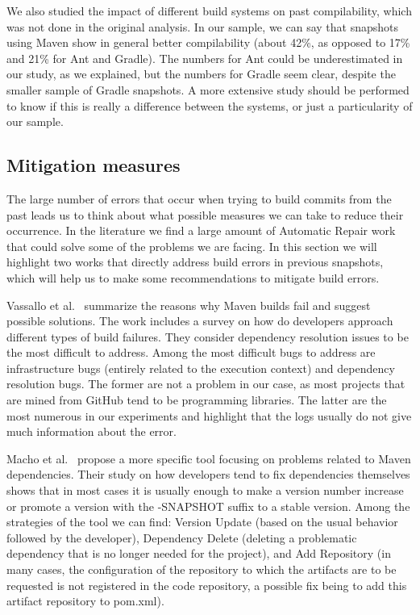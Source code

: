 We also studied the impact of different build systems on past compilability, which was not done in the original analysis. In our sample, we can say that snapshots using Maven show in general better compilability (about 42\%, as opposed to 17\% and 21\% for Ant and Gradle). The numbers for Ant could be underestimated in our study, as we explained, but the numbers for Gradle seem clear, despite the smaller sample of Gradle snapshots. A more extensive study should be performed to know if this is really a difference between the systems, or just a particularity of our sample.

\subsection{Mitigation measures}

The large number of errors that occur when trying to build commits from the past leads us to think about what possible measures we can take to reduce their occurrence. In the literature we find a large amount of Automatic Repair work that could solve some of the problems we are facing. In this section we will highlight two works that directly address build errors in previous snapshots, which will help us to make some recommendations to mitigate build errors.

Vassallo et al.~\cite{vassallo2020every} summarize the reasons why Maven builds fail and suggest possible solutions. The work includes a survey on how do developers approach different types of build failures. They consider dependency resolution issues to be the most difficult to address. Among the most difficult bugs to address are infrastructure bugs (entirely related to the execution context) and dependency resolution bugs. The former are not a problem in our case, as most projects that are mined from GitHub tend to be programming libraries. The latter are the most numerous in our experiments and highlight that the logs usually do not give much information about the error.

Macho et al.~\cite{macho2018automatically} propose a more specific tool focusing on problems related to Maven dependencies. Their study on how developers tend to fix dependencies themselves shows that in most cases it is usually enough to make a version number increase or promote a version with the -SNAPSHOT suffix to a stable version. Among the strategies of the tool we can find: Version Update (based on the usual behavior followed by the developer), Dependency Delete (deleting a problematic dependency that is no longer needed for the project), and Add Repository (in many cases, the configuration of the repository to which the artifacts are to be requested is not registered in the code repository, a possible fix being to add this artifact repository to pom.xml).

